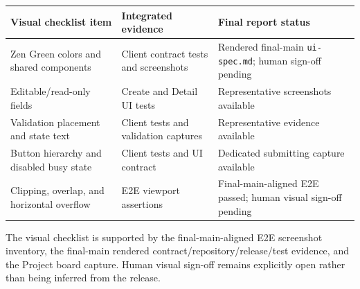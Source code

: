 \documentclass[10pt,a4paper]{article}
\begin{document}
\begin{center}
\small
\begin{tabular}{@{}p{59mm}p{35mm}p{62mm}@{}}
  \toprule
  Visual checklist item & Integrated evidence & Final report status \\
  \midrule
  Zen Green colors and shared components & Client contract tests and screenshots & Rendered final-main \texttt{ui-spec.md}; human sign-off pending \\
  Editable/read-only fields & Create and Detail UI tests & Representative screenshots available \\
  Validation placement and state text & Client tests and validation captures & Representative evidence available \\
  Button hierarchy and disabled busy state & Client tests and UI contract & Dedicated submitting capture available \\
  Clipping, overlap, and horizontal overflow & E2E viewport assertions & Final-main-aligned E2E passed; human visual sign-off pending \\
  \bottomrule
\end{tabular}
\end{center}

The visual checklist is supported by the final-main-aligned E2E screenshot
inventory, the final-main rendered contract/repository/release/test evidence,
and the Project board capture. Human visual sign-off remains
explicitly open rather than being inferred from the release.
\end{document}
